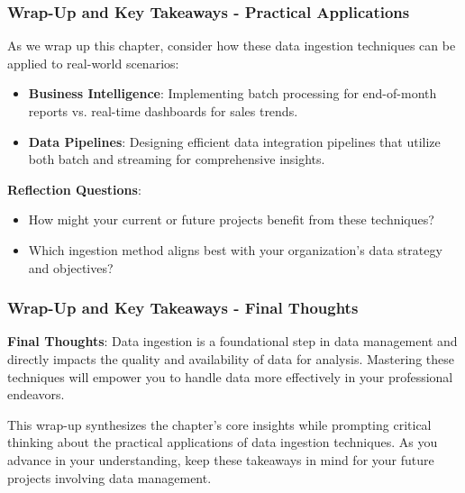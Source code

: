 \documentclass{beamer}
\begin{document}
\begin{frame}[fragile]
    \frametitle{Wrap-Up and Key Takeaways - Practical Applications}
    As we wrap up this chapter, consider how these data ingestion techniques can be applied to real-world scenarios:
    
    \begin{itemize}
        \item \textbf{Business Intelligence}: Implementing batch processing for end-of-month reports vs. real-time dashboards for sales trends.
        \item \textbf{Data Pipelines}: Designing efficient data integration pipelines that utilize both batch and streaming for comprehensive insights.
    \end{itemize}
    
    \textbf{Reflection Questions}:
    \begin{itemize}
        \item How might your current or future projects benefit from these techniques?
        \item Which ingestion method aligns best with your organization’s data strategy and objectives?
    \end{itemize}
\end{frame}

\begin{frame}[fragile]
    \frametitle{Wrap-Up and Key Takeaways - Final Thoughts}
    \textbf{Final Thoughts}:
    Data ingestion is a foundational step in data management and directly impacts the quality and availability of data for analysis. 
    Mastering these techniques will empower you to handle data more effectively in your professional endeavors.
    
    This wrap-up synthesizes the chapter's core insights while prompting critical thinking about the practical applications of data ingestion techniques. 
    As you advance in your understanding, keep these takeaways in mind for your future projects involving data management.
\end{frame}
\end{document}
